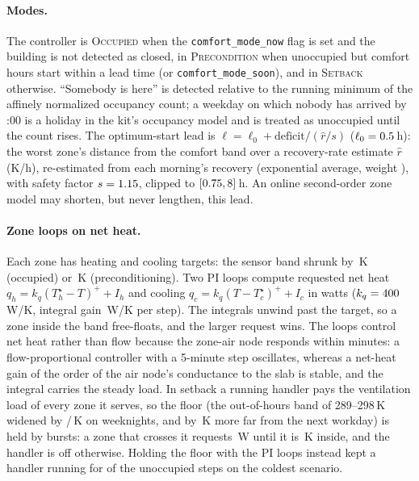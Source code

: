 \documentclass{article}
\begin{document}
\paragraph{Modes.} The controller is \textsc{Occupied} when the \texttt{comfort\_mode\_now} flag is set and the building is not detected as closed, in \textsc{Precondition} when unoccupied but comfort hours start within a lead time (or \texttt{comfort\_mode\_soon}), and in \textsc{Setback} otherwise. ``Somebody is here'' is detected relative to the running minimum of the affinely normalized occupancy count; a weekday on which nobody has arrived by \ParHolidayCheckH{}:00 is a holiday in the kit's occupancy model and is treated as unoccupied until the count rises. The optimum-start lead is $\ell = \ell_0 + \text{deficit}/(\hat{r}/s)$ ($\ell_0 = 0.5$\,h): the worst zone's distance from the comfort band over a recovery-rate estimate $\hat{r}$ (K/h), re-estimated from each morning's recovery (exponential average, weight \ParRateEma), with safety factor $s=1.15$, clipped to $[0.75, 8]$\,h. An online second-order zone model may shorten, but never lengthen, this lead.

\paragraph{Zone loops on net heat.} Each zone has heating and cooling targets: the sensor band shrunk by \ParMarginOcc\,K (occupied) or \ParMarginPre\,K (preconditioning). Two PI loops compute requested net heat $q_h = k_q (T_h^\star - T)^+ + I_h$ and cooling $q_c = k_q (T - T_c^\star)^+ + I_c$ in watts ($k_q = 400$\,W/K, integral gain \ParKiWPerKStep\,W/K per step). The integrals unwind past the target, so a zone inside the band free-floats, and the larger request wins. The loops control net heat rather than flow because the zone-air node responds within minutes: a flow-proportional controller with a 5-minute step oscillates, whereas a net-heat gain of the order of the air node's conductance to the slab is stable, and the integral carries the steady load. In setback a running handler pays the ventilation load of every zone it serves, so the floor (the out-of-hours band of 289--298\,K widened by \ParNightLowExt{}/\ParNightHighExt\,K on weeknights, and by \RTenWkExtLo\,K more far from the next workday) is held by bursts: a zone that crosses it requests \ParQSbW\,W until it is \ParSbHystK\,K inside, and the handler is off otherwise. Holding the floor with the PI loops instead kept a handler running for \VthreeAhuOnUnocc{} of the unoccupied steps on the coldest scenario.
\end{document}
